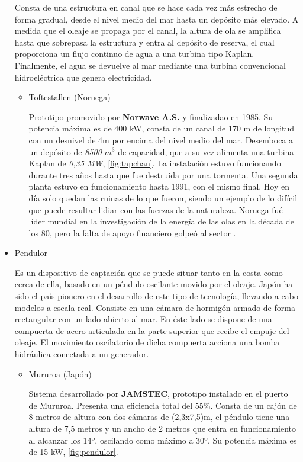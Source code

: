 \begin{itemize}
  Consta de una estructura en canal que se hace cada vez más estrecho de
  forma gradual, desde el nivel medio del mar hasta un depósito más
  elevado. A medida que el oleaje se propaga por el canal, la altura de
  ola se amplifica hasta que sobrepasa la estructura y entra al depósito
  de reserva, el cual proporciona un flujo continuo de agua a una
  turbina tipo Kaplan. Finalmente, el agua se devuelve al mar mediante
  una turbina convencional hidroeléctrica que genera electricidad.

  \begin{itemize}
  \item
    Toftestallen (Noruega)

    Prototipo promovido por \textbf{Norwave A.S.} y finalizadao en 1985.
    Su potencia máxima es de 400 kW, consta de un canal de 170 m de
    longitud con un desnivel de 4m por encima del nivel medio del mar.
    Desemboca a un depósito de \emph{8500} \(m^3\) de capacidad, que a
    su vez alimenta una turbina Kaplan de \emph{0,35 MW}, \autoref{fig:tapchan}. La instalación
    estuvo funcionando durante tres años hasta que fue destruida por
    una tormenta. Una segunda planta estuvo en funcionamiento hasta
    1991, con el mismo final. Hoy en día solo quedan las ruinas de lo
    que fueron, siendo un ejemplo de lo difícil que puede resultar
    lidiar con las fuerzas de la naturaleza. Noruega fué líder mundial
    en la investigación de la energía de las olas en la década de los
    80, pero la falta de apoyo financiero golpeó al sector \cite{toftestallen15}.
    

  \end{itemize}
\item
  Pendulor

  Es un dispositivo de captación que se puede situar tanto en la costa
  como cerca de ella, basado en un péndulo oscilante movido por el
  oleaje. Japón ha sido el país pionero en el desarrollo de este tipo de
  tecnología, llevando a cabo modelos a escala real. Consiste en una
  cámara de hormigón armado de forma rectangular con un lado abierto al
  mar. En éste lado se dispone de una compuerta de acero articulada en
  la parte superior que recibe el empuje del oleaje. El movimiento
  oscilatorio de dicha compuerta acciona una bomba hidráulica conectada
  a un generador.

  \begin{itemize}
  \item
    Mururoa (Japón)

    Sistema desarrollado por \textbf{JAMSTEC}, prototipo instalado en el
    puerto de Mururoa. Presenta una eficiencia total del 55\%. Consta de
    un cajón de 8 metros de altura con dos cámaras de (2,3x7,5)m, el
    péndulo tiene una altura de 7,5 metros y un ancho de 2 metros que
    entra en funcionamiento al alcanzar los 14º, oscilando como máximo a
    30º. Su potencia máxima es de 15 kW, \autoref{fig:pendulor}.

  \end{itemize}
\end{itemize}

